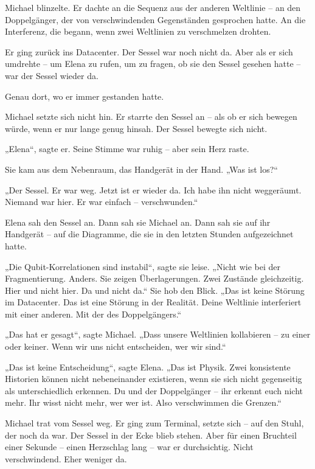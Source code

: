 \documentclass[
]{article}
\begin{document}
Michael blinzelte. Er dachte an die Sequenz aus der anderen Weltlinie -- an den Doppelgänger, der von verschwindenden Gegenständen gesprochen hatte. An die Interferenz, die begann, wenn zwei Weltlinien zu verschmelzen drohten.

Er ging zurück ins Datacenter. Der Sessel war noch nicht da. Aber als er sich umdrehte -- um Elena zu rufen, um zu fragen, ob sie den Sessel gesehen hatte -- war der Sessel wieder da.

Genau dort, wo er immer gestanden hatte.

Michael setzte sich nicht hin. Er starrte den Sessel an -- als ob er sich bewegen würde, wenn er nur lange genug hinsah. Der Sessel bewegte sich nicht.

„Elena``, sagte er. Seine Stimme war ruhig -- aber sein Herz raste.

Sie kam aus dem Nebenraum, das Handgerät in der Hand. „Was ist los?{\kern0pt}``

„Der Sessel. Er war weg. Jetzt ist er wieder da. Ich habe ihn nicht weggeräumt. Niemand war hier. Er war einfach -- verschwunden.``

Elena sah den Sessel an. Dann sah sie Michael an. Dann sah sie auf ihr Handgerät -- auf die Diagramme, die sie in den letzten Stunden aufgezeichnet hatte.

„Die Qubit-Korrelationen sind instabil``, sagte sie leise. „Nicht wie bei der Fragmentierung. Anders. Sie zeigen Überlagerungen. Zwei Zustände gleichzeitig. Hier und nicht hier. Da und nicht da.`` Sie hob den Blick. „Das ist keine Störung im Datacenter. Das ist eine Störung in der Realität. Deine Weltlinie interferiert mit einer anderen. Mit der des Doppelgängers.``

„Das hat er gesagt``, sagte Michael. „Dass unsere Weltlinien kollabieren -- zu einer oder keiner. Wenn wir uns nicht entscheiden, wer wir sind.``

„Das ist keine Entscheidung``, sagte Elena. „Das ist Physik. Zwei konsistente Historien können nicht nebeneinander existieren, wenn sie sich nicht gegenseitig als unterschiedlich erkennen. Du und der Doppelgänger -- ihr erkennt euch nicht mehr. Ihr wisst nicht mehr, wer wer ist. Also verschwimmen die Grenzen.``

Michael trat vom Sessel weg. Er ging zum Terminal, setzte sich -- auf den Stuhl, der noch da war. Der Sessel in der Ecke blieb stehen. Aber für einen Bruchteil einer Sekunde -- einen Herzschlag lang -- war er durchsichtig. Nicht verschwindend. Eher weniger da.
\end{document}
